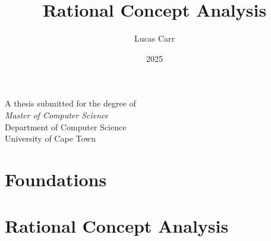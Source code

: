 \documentclass[8pt, a4paper, twoside]{report}
\title{Rational Concept Analysis}
\author{Lucas Carr}
\date{2025}
\begin{document}
\begin{titlepage}
	\centering
	\vspace*{2cm}
	{\Huge \bfseries \thetitle \par}
	\vspace{1.5cm}
	{\Large \theauthor \par}
	\vfill
	A thesis submitted for the degree of \\ \textit{Master of Computer Science} \\ Department of Computer Science \\
	University of Cape Town \\
	\vspace{1cm}
	\thedate
\end{titlepage}



\tableofcontents


\part{Foundations}



\part{Rational Concept Analysis}






\printindex \listoffigures

\end{document}
